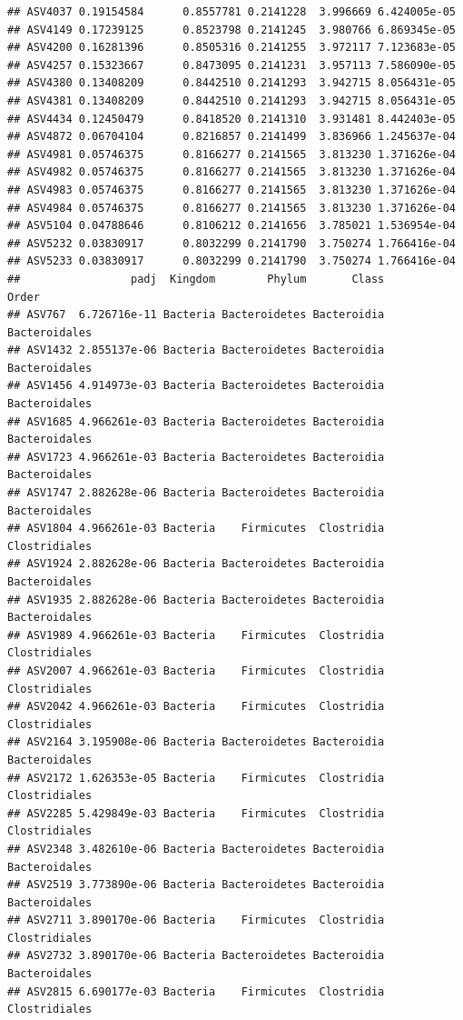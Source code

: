 \documentclass[]{article}
\begin{document}
\begin{verbatim}
## ASV4037 0.19154584      0.8557781 0.2141228  3.996669 6.424005e-05
## ASV4149 0.17239125      0.8523798 0.2141245  3.980766 6.869345e-05
## ASV4200 0.16281396      0.8505316 0.2141255  3.972117 7.123683e-05
## ASV4257 0.15323667      0.8473095 0.2141231  3.957113 7.586090e-05
## ASV4380 0.13408209      0.8442510 0.2141293  3.942715 8.056431e-05
## ASV4381 0.13408209      0.8442510 0.2141293  3.942715 8.056431e-05
## ASV4434 0.12450479      0.8418520 0.2141310  3.931481 8.442403e-05
## ASV4872 0.06704104      0.8216857 0.2141499  3.836966 1.245637e-04
## ASV4981 0.05746375      0.8166277 0.2141565  3.813230 1.371626e-04
## ASV4982 0.05746375      0.8166277 0.2141565  3.813230 1.371626e-04
## ASV4983 0.05746375      0.8166277 0.2141565  3.813230 1.371626e-04
## ASV4984 0.05746375      0.8166277 0.2141565  3.813230 1.371626e-04
## ASV5104 0.04788646      0.8106212 0.2141656  3.785021 1.536954e-04
## ASV5232 0.03830917      0.8032299 0.2141790  3.750274 1.766416e-04
## ASV5233 0.03830917      0.8032299 0.2141790  3.750274 1.766416e-04
##                 padj  Kingdom        Phylum       Class           Order
## ASV767  6.726716e-11 Bacteria Bacteroidetes Bacteroidia   Bacteroidales
## ASV1432 2.855137e-06 Bacteria Bacteroidetes Bacteroidia   Bacteroidales
## ASV1456 4.914973e-03 Bacteria Bacteroidetes Bacteroidia   Bacteroidales
## ASV1685 4.966261e-03 Bacteria Bacteroidetes Bacteroidia   Bacteroidales
## ASV1723 4.966261e-03 Bacteria Bacteroidetes Bacteroidia   Bacteroidales
## ASV1747 2.882628e-06 Bacteria Bacteroidetes Bacteroidia   Bacteroidales
## ASV1804 4.966261e-03 Bacteria    Firmicutes  Clostridia   Clostridiales
## ASV1924 2.882628e-06 Bacteria Bacteroidetes Bacteroidia   Bacteroidales
## ASV1935 2.882628e-06 Bacteria Bacteroidetes Bacteroidia   Bacteroidales
## ASV1989 4.966261e-03 Bacteria    Firmicutes  Clostridia   Clostridiales
## ASV2007 4.966261e-03 Bacteria    Firmicutes  Clostridia   Clostridiales
## ASV2042 4.966261e-03 Bacteria    Firmicutes  Clostridia   Clostridiales
## ASV2164 3.195908e-06 Bacteria Bacteroidetes Bacteroidia   Bacteroidales
## ASV2172 1.626353e-05 Bacteria    Firmicutes  Clostridia   Clostridiales
## ASV2285 5.429849e-03 Bacteria    Firmicutes  Clostridia   Clostridiales
## ASV2348 3.482610e-06 Bacteria Bacteroidetes Bacteroidia   Bacteroidales
## ASV2519 3.773890e-06 Bacteria Bacteroidetes Bacteroidia   Bacteroidales
## ASV2711 3.890170e-06 Bacteria    Firmicutes  Clostridia   Clostridiales
## ASV2732 3.890170e-06 Bacteria Bacteroidetes Bacteroidia   Bacteroidales
## ASV2815 6.690177e-03 Bacteria    Firmicutes  Clostridia   Clostridiales

\end{verbatim}
\end{document}
